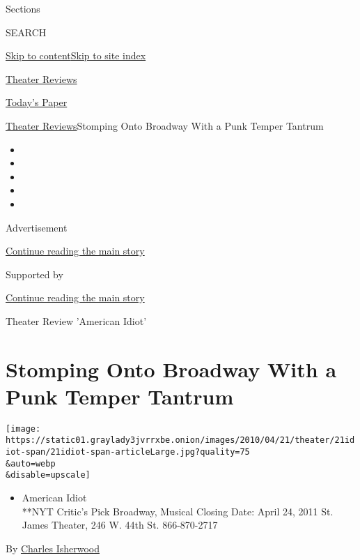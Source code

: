 Sections

SEARCH

\protect\hyperlink{site-content}{Skip to
content}\protect\hyperlink{site-index}{Skip to site index}

\href{https://www.nytimes3xbfgragh.onion/pages/theater/index.html}{Theater
Reviews}

\href{https://myaccount.nytimes3xbfgragh.onion/auth/login?response_type=cookie\&client_id=vi}{}

\href{https://www.nytimes3xbfgragh.onion/section/todayspaper}{Today's
Paper}

\href{/pages/theater/index.html}{Theater Reviews}\textbar{}Stomping Onto
Broadway With a Punk Temper Tantrum

\begin{itemize}
\item
\item
\item
\item
\item
\end{itemize}

Advertisement

\protect\hyperlink{after-top}{Continue reading the main story}

Supported by

\protect\hyperlink{after-sponsor}{Continue reading the main story}

Theater Review \textbar{} 'American Idiot'

\hypertarget{stomping-onto-broadway-with-a-punk-temper-tantrum}{%
\section{Stomping Onto Broadway With a Punk Temper
Tantrum}\label{stomping-onto-broadway-with-a-punk-temper-tantrum}}

\texttt{[image: https://static01.graylady3jvrrxbe.onion/images/2010/04/21/theater/21idiot-span/21idiot-span-articleLarge.jpg?quality=75\\\&auto=webp\\\&disable=upscale]}

\begin{itemize}
\tightlist
\item
  American Idiot\\
  **NYT Critic's Pick Broadway, Musical Closing Date: April 24, 2011 St.
  James Theater, 246 W. 44th St. 866-870-2717
\end{itemize}

By
\href{https://www.nytimes3xbfgragh.onion/by/charles-isherwood}{Charles
Isherwood}

